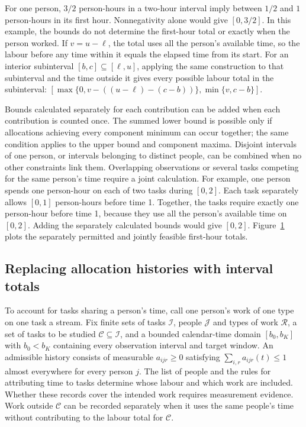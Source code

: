 For one person, $3/2$ person-hours in a two-hour interval imply between $1/2$ and $1$ person-hours in its first hour. Nonnegativity alone would give $[0,3/2]$. In this example, the bounds do not determine the first-hour total or exactly when the person worked. If $v=u-\ell$, the total uses all the person's available time, so the labour before any time within it equals the elapsed time from its start. For an interior subinterval $[b,c]\subseteq[\ell,u]$, applying the same construction to that subinterval and the time outside it gives every possible labour total in the subinterval: $[\max\{0,v-((u-\ell)-(c-b))\},\min\{v,c-b\}]$.

Bounds calculated separately for each contribution can be added when each contribution is counted once. The summed lower bound is possible only if allocations achieving every component minimum can occur together; the same condition applies to the upper bound and component maxima. Disjoint intervals of one person, or intervals belonging to distinct people, can be combined when no other constraints link them. Overlapping observations or several tasks competing for the same person's time require a joint calculation. For example, one person spends one person-hour on each of two tasks during $[0,2]$. Each task separately allows $[0,1]$ person-hours before time 1. Together, the tasks require exactly one person-hour before time 1, because they use all the person's available time on $[0,2]$. Adding the separately calculated bounds would give $[0,2]$. Figure~\ref{fig:shared-capacity} plots the separately permitted and jointly feasible first-hour totals.

\begin{figure}[tbp]
\centering

\caption[Shared capacity and first-hour labour]{\protect}
\label{fig:shared-capacity}
\end{figure}

\subsection{Replacing allocation histories with interval totals}

To account for tasks sharing a person's time, call one person's work of one type on one task a stream. Fix finite sets of tasks $\mathcal I$, people $\mathcal J$ and types of work $\mathcal R$, a set of tasks to be studied $\mathcal C\subseteq\mathcal I$, and a bounded calendar-time domain $[b_0,b_K]$ with $b_0<b_K$ containing every observation interval and target window. An admissible history consists of measurable $a_{ijr}\geq0$ satisfying $\sum_{i,r}a_{ijr}(t)\leq1$ almost everywhere for every person $j$. The list of people and the rules for attributing time to tasks determine whose labour and which work are included. Whether these records cover the intended work requires measurement evidence. Work outside $\mathcal C$ can be recorded separately when it uses the same people's time without contributing to the labour total for $\mathcal C$.

